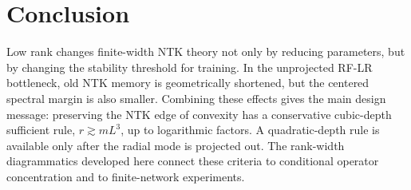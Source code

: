 \documentclass{article}
\begin{document}
\section{Conclusion}
Low rank changes finite-width NTK theory not only by reducing parameters, but by changing the stability threshold for training. In the unprojected RF-LR bottleneck, old NTK memory is geometrically shortened, but the centered spectral margin is also smaller. Combining these effects gives the main design message: preserving the NTK edge of convexity has a conservative cubic-depth sufficient rule, \(r\gtrsim mL^3\), up to logarithmic factors. A quadratic-depth rule is available only after the radial mode is projected out. The rank-width diagrammatics developed here connect these criteria to conditional operator concentration and to finite-network experiments.
\end{document}
